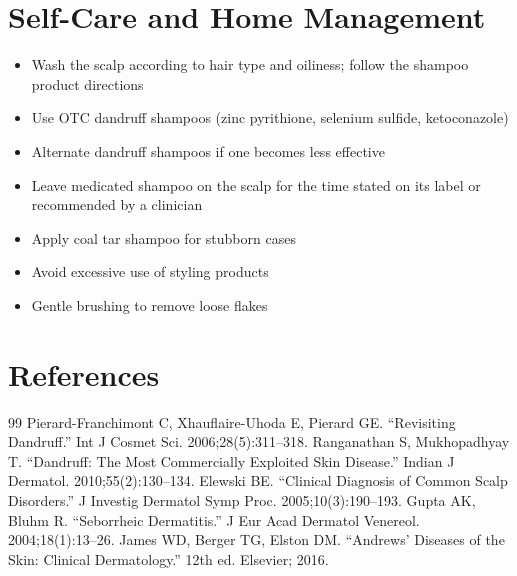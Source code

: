 \section*{Self-Care and Home Management}
\begin{itemize}
 \item Wash the scalp according to hair type and oiliness; follow the shampoo product directions
\item Use OTC dandruff shampoos (zinc pyrithione, selenium sulfide, ketoconazole)
\item Alternate dandruff shampoos if one becomes less effective
 \item Leave medicated shampoo on the scalp for the time stated on its label or recommended by a clinician
\item Apply coal tar shampoo for stubborn cases
\item Avoid excessive use of styling products
\item Gentle brushing to remove loose flakes
\end{itemize}

\section*{References}
\begin{thebibliography}{99}
 Pierard-Franchimont C, Xhauflaire-Uhoda E, Pierard GE. ``Revisiting Dandruff.'' Int J Cosmet Sci. 2006;28(5):311--318.
 Ranganathan S, Mukhopadhyay T. ``Dandruff: The Most Commercially Exploited Skin Disease.'' Indian J Dermatol. 2010;55(2):130--134.
 Elewski BE. ``Clinical Diagnosis of Common Scalp Disorders.'' J Investig Dermatol Symp Proc. 2005;10(3):190--193.
 Gupta AK, Bluhm R. ``Seborrheic Dermatitis.'' J Eur Acad Dermatol Venereol. 2004;18(1):13--26.
 James WD, Berger TG, Elston DM. ``Andrews' Diseases of the Skin: Clinical Dermatology.'' 12th ed. Elsevier; 2016.
\end{thebibliography}

